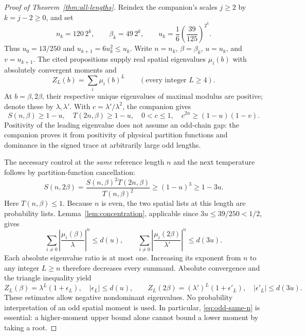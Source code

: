 \documentclass[11pt,a4paper]{article}
\begin{document}
\begin{proof}[Proof of Theorem~\ref{thm:all-lengths}]
Reindex the companion's scales $j\ge2$ by $k=j-2\ge0$, and set
\begin{equation}\label{eq:odd-scales}
 n_k=120\,2^k,\qquad \beta_k=49\,2^k,\qquad
 u_k=\frac16\left(\frac{39}{125}\right)^{2^k}.
\end{equation}
Thus $u_0=13/250$ and $u_{k+1}=6u_k^2\le u_k$.
Write $n=n_k$, $\beta=\beta_k$, $u=u_k$, and $v=u_{k+1}$.
The cited propositions supply real spatial eigenvalues $\mu_i(b)$ with
absolutely convergent moments and
\[
 Z_L(b)=\sum_i\mu_i(b)^L\qquad(\text{every integer }L\ge4).
\]
At $b=\beta,2\beta$, their respective unique eigenvalues of maximal
modulus are positive; denote these by $\lambda,\lambda'$.
With $c=\lambda'/\lambda^2$, the companion gives
\begin{equation}\label{eq:odd-inputs}
 S(n,\beta)\ge1-u,\quad T(2n,\beta)\ge1-u,\quad
 0<c\le1,\quad c^{2n}\ge(1-u)(1-v).
\end{equation}
Positivity of the leading eigenvalue does not assume an odd-chain gap:
the companion proves it from positivity of physical partition functions
and dominance in the signed trace at arbitrarily large odd lengths.

The necessary control at the \emph{same} reference length $n$ and the
next temperature follows by partition-function cancellation:
\begin{equation}\label{eq:odd-same-n}
 S(n,2\beta)=\frac{S(n,\beta)^2T(2n,\beta)}{T(n,\beta)^2}
 \ge(1-u)^3\ge1-3u.
\end{equation}
Here $T(n,\beta)\le1$. Because $n$ is even, the two spatial lists at
this length are probability lists. Lemma~\ref{lem:concentration},
applicable since $3u\le39/250<1/2$, gives
\begin{equation}\label{eq:odd-tails}
 \sum_{i\ne0}\left|\frac{\mu_i(\beta)}{\lambda}\right|^n\le d(u),
 \qquad
 \sum_{i\ne0}\left|\frac{\mu_i(2\beta)}{\lambda'}\right|^n\le d(3u).
\end{equation}
Each absolute eigenvalue ratio is at most one. Increasing its exponent
from $n$ to any integer $L\ge n$ therefore decreases every summand.
Absolute convergence and the triangle inequality yield
\[
 Z_L(\beta)=\lambda^L(1+\epsilon_L),\quad |\epsilon_L|\le d(u),
 \qquad
 Z_L(2\beta)=(\lambda')^L(1+\epsilon'_L),\quad
 |\epsilon'_L|\le d(3u).
\]
These estimates allow negative nondominant eigenvalues. No probability
interpretation of an odd spatial moment is used. In particular,
\eqref{eq:odd-same-n} is essential: a higher-moment upper bound alone
cannot bound a lower moment by taking a root.


\end{proof}
\end{document}
